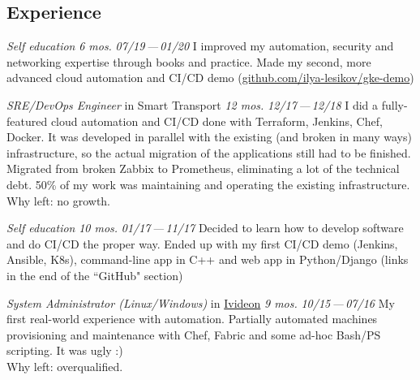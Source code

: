 \documentclass[11pt, a4paper]{article}
\newcommand{\Delimitline}{
  \vspace{-2ex}
  \noindent\makebox[\linewidth]{\rule{\DelimitlineLength}{0.12ex}} }
\newcommand{\forceindent}{\leavevmode{\parindent=1em\indent}}
\begin{document}
\subsection*{\vphantom{Professional Work }Experience}
\Delimitline

\begin{etaremune}[
  topsep=1ex,itemsep=1.5ex,partopsep=0ex,
  parsep=0ex,rightmargin=1em,leftmargin=2em
]
  \item
    \emph{Self education}\hfill
    \textit{6 mos.}\hspace{1.0em}
    \textit{07/19\,—\,01/20}\vspace{1.5ex}\newline
    \forceindent I improved my automation, security and networking expertise through books and practice. Made my second, more advanced cloud automation and CI/CD demo (\href{https://github.com/ilya-lesikov/gke-demo}{github.com/ilya-lesikov/gke-demo})

  \item
    \emph{SRE/DevOps Engineer}\hfill
    in Smart Transport\hspace{1.0em}
    \textit{12 mos.}\hspace{1.0em}
    \textit{12/17\,—\,12/18}\vspace{1.5ex}\newline
    \forceindent I did a fully-featured cloud automation and CI/CD done with Terraform, Jenkins, Chef, Docker. It was developed in parallel with the existing (and broken in many ways) infrastructure, so the actual migration of the applications still had to be finished. Migrated from broken Zabbix to Prometheus, eliminating a lot of the technical debt. 50\% of my work was maintaining and operating the existing infrastructure.\\[0.7ex]
    \forceindent Why left: no growth.

\newpage

  \item
    \emph{Self education}\hfill
    \textit{10 mos.}\hspace{1.0em}
    \textit{01/17\,—\,11/17}\vspace{1.5ex}\newline
    \forceindent Decided to learn how to develop software and do CI/CD the proper way. Ended up with my first CI/CD demo (Jenkins, Ansible, K8s), command-line app in C++ and web app in Python/Django (links in the end of the ``GitHub" section)

  \item
    \emph{System Administrator (Linux/Windows)}\hfill
    in \href{https://ivideon.com}{Ivideon}\hspace{1.0em}
    \textit{9 mos.}\hspace{1.0em}
    \textit{10/15\,—\,07/16}\vspace{1.5ex}\newline
    \forceindent My first real-world experience with automation. Partially automated machines provisioning and maintenance with Chef, Fabric and some ad-hoc Bash/PS scripting. It was ugly :)\\[0.7ex]
    \forceindent Why left: overqualified.


\end{etaremune}
\end{document}
